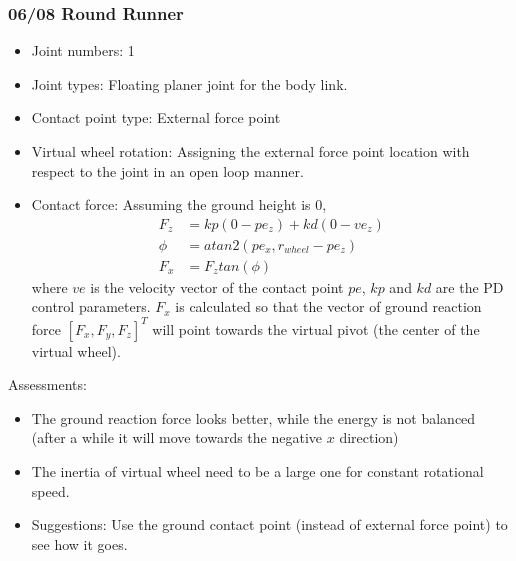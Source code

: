 \subsubsection*{06/08 Round Runner}
\begin{itemize}
\item Joint numbers: 1
\item Joint types: Floating planer joint for the body link.
\item Contact point type: External force point
\item Virtual wheel rotation: Assigning the external force point location with respect to the joint in an open loop manner.
\item 
Contact force: Assuming the ground height is $0$,
\begin{align}
F_z &= kp(0-pe_z) + kd(0 - ve_z)\\
\phi &= atan2(pe_x,r_{wheel}-pe_z)\\
F_x &= F_ztan(\phi)
\end{align}
where $ve$ is the velocity vector of the contact point $pe$, $kp$ and $kd$ are the PD control parameters. $F_x$ is calculated so that the vector of ground reaction force $[F_x,F_y,F_z]^T$ will point towards the virtual pivot (the center of the virtual wheel).\\
\end{itemize}



Assessments:
\begin{itemize}
\item The ground reaction force looks better, while the energy is not balanced (after a while it will move towards the negative $x$ direction)
\item The inertia of virtual wheel need to be a large one for constant rotational speed.
\item Suggestions: Use the ground contact point (instead of external force point) to see how it goes.

\end{itemize}

